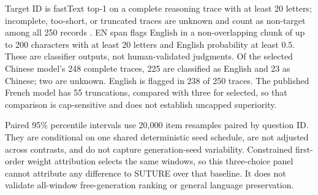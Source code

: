 Target ID is fastText top-1 on a complete reasoning trace with at least 20
letters; incomplete, too-short, or truncated traces are unknown and count as
non-target among all 250 records \citep{grave2018fasttext}. EN span flags
English in a non-overlapping chunk of up to 200 characters with at least 20
letters and English probability at least $0.5$. These are classifier outputs,
not human-validated judgments. Of the selected Chinese model's 248 complete traces, 225
are classified as English and 23 as Chinese; two are unknown. English is
flagged in 238 of 250 traces. The published French model has 55 truncations,
compared with three for selected, so that comparison is cap-sensitive and does
not establish uncapped superiority.

Paired 95\% percentile intervals use 20,000 item resamples paired by question
ID. They are conditional on one shared deterministic seed schedule, are not
adjusted across contrasts, and do not capture generation-seed variability.
Constrained first-order weight attribution selects the same windows, so this three-choice
panel cannot attribute any difference to SUTURE over that baseline. It does
not validate all-window free-generation ranking or general language
preservation.

